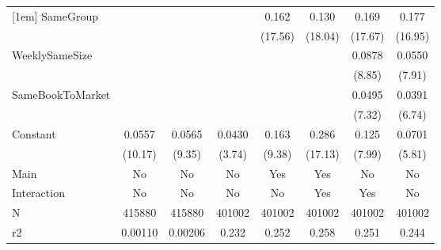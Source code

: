 {\begin{tabular}{l*{7}{c}}
[1em]
SameGroup           &                     &                     &                     &       0.162\sym{***}&       0.130\sym{***}&       0.169\sym{***}&       0.177\sym{***}\\
                    &                     &                     &                     &     (17.56)         &     (18.04)         &     (17.67)         &     (16.95)         \\
[1em]
WeeklySameSize      &                     &                     &                     &                     &                     &      0.0878\sym{***}&      0.0550\sym{***}\\
                    &                     &                     &                     &                     &                     &      (8.85)         &      (7.91)         \\
[1em]
SameBookToMarket    &                     &                     &                     &                     &                     &      0.0495\sym{***}&      0.0391\sym{***}\\
                    &                     &                     &                     &                     &                     &      (7.32)         &      (6.74)         \\
[1em]
Constant            &      0.0557\sym{***}&      0.0565\sym{***}&      0.0430\sym{***}&       0.163\sym{***}&       0.286\sym{***}&       0.125\sym{***}&      0.0701\sym{***}\\
                    &     (10.17)         &      (9.35)         &      (3.74)         &      (9.38)         &     (17.13)         &      (7.99)         &      (5.81)         \\
\hline
Main                &          No         &          No         &          No         &         Yes         &         Yes         &          No         &          No         \\
Interaction         &          No         &          No         &          No         &          No         &         Yes         &         Yes         &          No         \\
N                   &      415880         &      415880         &      401002         &      401002         &      401002         &      401002         &      401002         \\
r2                  &     0.00110         &     0.00206         &       0.232         &       0.252         &       0.258         &       0.251         &       0.244         \\

\end{tabular}}
